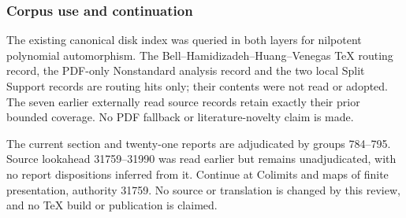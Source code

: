\subsubsection{Corpus use and continuation}\label{algebra-proof-035-corpus-use-and-continuation}

The existing canonical disk index was queried in both layers for nilpotent polynomial automorphism. The Bell--Hamidizadeh--Huang--Venegas TeX routing record, the PDF-only Nonstandard analysis record and the two local Split Support records are routing hits only; their contents were not read or adopted. The seven earlier externally read source records retain exactly their prior bounded coverage. No PDF fallback or literature-novelty claim is made.

The current section and twenty-one reports are adjudicated by groups 784--795. Source lookahead 31759--31990 was read earlier but remains unadjudicated, with no report dispositions inferred from it. Continue at Colimits and maps of finite presentation, authority 31759. No source or translation is changed by this review, and no TeX build or publication is claimed.
